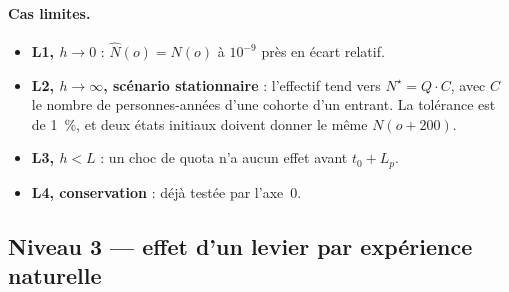 \paragraph{Cas limites.}
\begin{itemize}
  \item \textbf{L1, $h \to 0$} : $\hat N(o) = N(o)$ à $10^{-9}$ près en écart relatif.
  \item \textbf{L2, $h \to \infty$, scénario stationnaire} : l'effectif tend vers
        $N^\star = Q \cdot C$, avec $C$ le nombre de personnes-années d'une cohorte d'un entrant. La
        tolérance est de 1\suppose{}~\%, et deux états initiaux doivent donner le même $N(o+200)$.
  \item \textbf{L3, $h < L$} : un choc de quota n'a aucun effet avant $t_0 + L_p$.
  \item \textbf{L4, conservation} : déjà testée par l'axe~0.
\end{itemize}

\subsection{Niveau 3 --- effet d'un levier par expérience naturelle}
